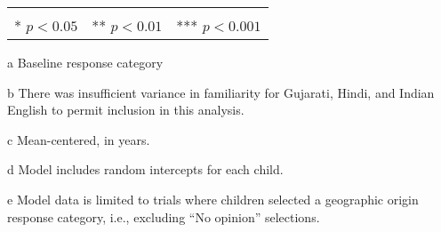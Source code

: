 \begin{table*}[t]
\begin{threeparttable}
\begin{tabular}{llcrclcrc}
\bottomrule\\[-.75em]
\multicolumn{9}{r}{* $p<0.05$~~** $p<0.01$~~*** $p<0.001$}\\
\end{tabular}
\begin{tablenotes}[flushleft]
    \item[a] Baseline response category
    \item[b] There was insufficient variance in familiarity for Gujarati, Hindi, and Indian English to permit inclusion in this analysis. 
    \item[c] Mean-centered, in years.
    \item[d] Model includes random intercepts for each child.
    \item[e] Model data is limited to trials where children selected a geographic origin response category, i.e., excluding ``No opinion'' selections. 
\end{tablenotes}
\end{threeparttable}
\end{table*}